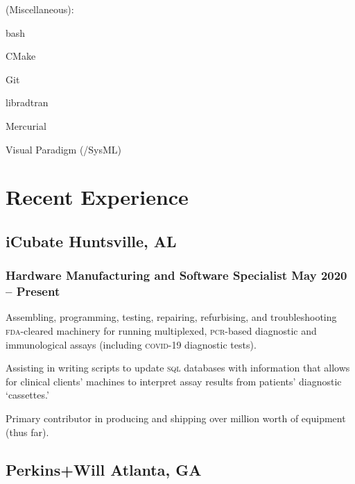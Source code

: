 \documentclass[letterpaper, oneside, 10pt]{article}
\begin{document}
\begin{multicols}{2}
{  {\jostmedium (Miscellaneous):}%
    \begin{itemize*}[%
      label=\relax, labelwidth=0pt, itemjoin=\space\char"00B7%
    ]%
      \item bash%
      \item CMake%
      \item {}%
      \item Git%
      \item {}%
      \item libradtran%
      \item Mercurial%
      \item {}%
      \item Visual Paradigm (/SysML)%
    \end{itemize*}
  }
\end{multicols}

\section*{Recent Experience} %

\hfill
\vspace{-24pt}


\subsection*{iCubate\DotSep{0.25em} Huntsville, AL}
\subsubsection*{Hardware Manufacturing and Software Specialist\DotSep{0.25em} May 2020 -- Present}

Assembling, programming, testing, repairing, refurbising, and troubleshooting
\textsc{fda}-cleared machinery for running multiplexed, \textsc{pcr}-based
diagnostic and immunological assays (including \textsc{covid}-19 diagnostic
tests).

Assisting in writing scripts to update \textsc{sql} databases with information
that allows for clinical clients' machines to interpret assay results from
patients' diagnostic `cassettes.'

Primary contributor in producing and shipping over million
worth of equipment (thus far).


\subsection*{Perkins+Will\DotSep{0.25em} Atlanta, GA}
\end{document}
